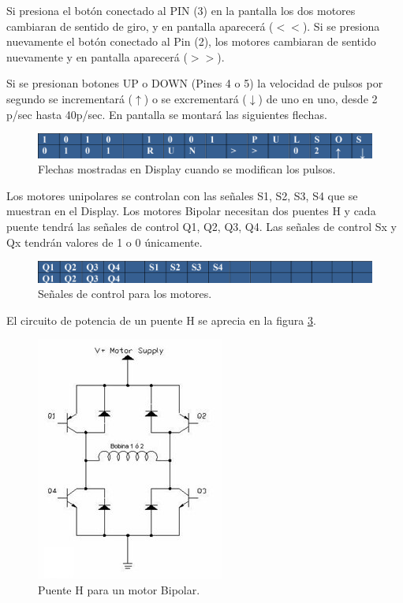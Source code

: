 Si presiona el botón conectado al PIN (3) en la pantalla los dos motores cambiaran de sentido de giro, y en pantalla aparecerá ($<<$). Si se presiona nuevamente el botón conectado al Pin (2), los motores cambiaran de sentido nuevamente y en pantalla aparecerá ($>>$).

Si se presionan botones UP o DOWN (Pines 4 o 5) la velocidad de pulsos por segundo se incrementará ($\uparrow$) o se excrementará ($\downarrow$) de uno en uno, desde 2 p/sec hasta 40p/sec. En pantalla se montará las siguientes flechas.
\begin{figure}[H]
	\centering
	\includegraphics[width=0.7\linewidth]{Imagenes/Fig5}
	\caption{Flechas mostradas en Display cuando se modifican los pulsos. }
	\label{fig:fig5}
\end{figure}
Los motores unipolares se controlan con las señales S1, S2, S3, S4 que se muestran en el Display. Los motores Bipolar necesitan dos puentes H y cada puente tendrá las señales de control Q1, Q2, Q3, Q4.  Las señales de control Sx y Qx tendrán valores de 1 o 0 únicamente.

\begin{figure}[H]
	\centering
	\includegraphics[width=0.7\linewidth]{Imagenes/Fig6}
	\caption{Señales de control para los motores.}
	\label{fig:fig6}
\end{figure}

El circuito de potencia de un puente H se aprecia en la figura \ref{fig:puenteh}.
\begin{figure}[H]
	\centering
	\includegraphics[width=0.4\linewidth]{Imagenes/PuenteH}
	\caption{Puente H para un motor Bipolar.}
	\label{fig:puenteh}
\end{figure}

